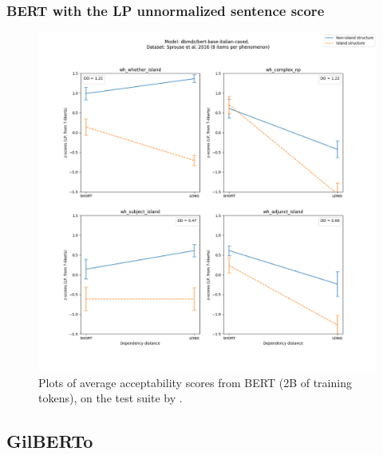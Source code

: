 \subsubsection{BERT with the LP unnormalized sentence score}
\begin{figure}[h]
	\centering
	\includegraphics[width=1\textwidth]{images/Chapter1/Sprouse_wh_dbmdz_bert-base-italian-cased_LP-zscores-likert-2022-09-17_h11m04s37.png} 
	\caption{Plots of average acceptability scores from BERT (2B of training tokens), on the test suite by \citet{sprouse2016experimental}.}
	\label{fig:sprouse_bert2b_lp} 
	\medskip
\end{figure}	


\clearpage
\subsection{GilBERTo}
